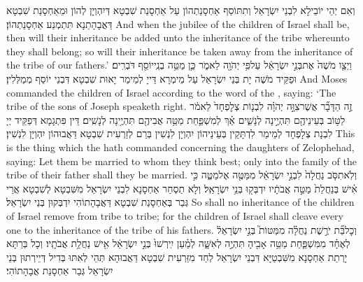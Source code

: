 {וְאִם יְהֵי יוֹבֵילָא לִבְנֵי יִשְׂרָאֵל וְתִתּוֹסַף אַחְסָנַתְהוֹן עַל אַחְסָנַת שִׁבְטָא דְּיִהְוְיָן לְהוֹן וּמֵאַחְסָנַת שִׁבְטָא דַּאֲבָהָתַנָא תִּתְמְנַע אַחְסָנַתְהוֹן׃}
{And when the jubilee of the children of Israel shall be, then will their inheritance be added unto the inheritance of the tribe whereunto they shall belong; so will their inheritance be taken away from the inheritance of the tribe of our fathers.’}{}
{וַיְצַ֤ו מֹשֶׁה֙ אֶת\maqqaf בְּנֵ֣י יִשְׂרָאֵ֔ל עַל\maqqaf פִּ֥י יְהֹוָ֖ה לֵאמֹ֑ר כֵּ֛ן מַטֵּ֥ה בְנֵֽי\maqqaf יוֹסֵ֖ף דֹּבְרִֽים׃}
{וּפַקֵּיד מֹשֶׁה יָת בְּנֵי יִשְׂרָאֵל עַל מֵימְרָא דַּייָ לְמֵימַר יָאוּת שִׁבְטָא דִּבְנֵי יוֹסֵף מְמַלְּלִין׃}
{And Moses commanded the children of Israel according to the word of the \lord, saying: ‘The tribe of the sons of Joseph speaketh right.}{}
{זֶ֣ה הַדָּבָ֞ר אֲשֶׁר\maqqaf צִוָּ֣ה יְהֹוָ֗ה לִבְנ֤וֹת צְלׇפְחָד֙ לֵאמֹ֔ר לַטּ֥וֹב בְּעֵינֵיהֶ֖ם תִּהְיֶ֣ינָה לְנָשִׁ֑ים אַ֗ךְ לְמִשְׁפַּ֛חַת מַטֵּ֥ה אֲבִיהֶ֖ם תִּהְיֶ֥ינָה לְנָשִֽׁים׃}
{דֵּין פִּתְגָמָא דְּפַקֵּיד יְיָ לִבְנָת צְלָפְחָד לְמֵימַר לִדְתָּקֵין בְּעֵינֵיהוֹן יִהְוְיָן לִנְשִׁין בְּרַם לְזַרְעִית שִׁבְטָא דַּאֲבוּהוֹן יִהְוְיָן לִנְשִׁין׃}
{This is the thing which the \lord\space hath commanded concerning the daughters of Zelophehad, saying: Let them be married to whom they think best; only into the family of the tribe of their father shall they be married.}{}
{וְלֹֽא\maqqaf תִסֹּ֤ב נַחֲלָה֙ לִבְנֵ֣י יִשְׂרָאֵ֔ל מִמַּטֶּ֖ה אֶל\maqqaf מַטֶּ֑ה כִּ֣י אִ֗ישׁ בְּנַחֲלַת֙ מַטֵּ֣ה אֲבֹתָ֔יו יִדְבְּק֖וּ בְּנֵ֥י יִשְׂרָאֵֽל׃}
{וְלָא תַסְחַר אַחְסָנָא לִבְנֵי יִשְׂרָאֵל מִשִּׁבְטָא לְשִׁבְטָא אֲרֵי גְּבַר בְּאַחְסָנַת שִׁבְטָא דַּאֲבָהָתוֹהִי יִדְבְּקוּן בְּנֵי יִשְׂרָאֵל׃}
{So shall no inheritance of the children of Israel remove from tribe to tribe; for the children of Israel shall cleave every one to the inheritance of the tribe of his fathers.}{}
{וְכׇל\maqqaf בַּ֞ת יֹרֶ֣שֶׁת נַחֲלָ֗ה מִמַּטּוֹת֮ בְּנֵ֣י יִשְׂרָאֵל֒ לְאֶחָ֗ד מִמִּשְׁפַּ֛חַת מַטֵּ֥ה אָבִ֖יהָ תִּהְיֶ֣ה לְאִשָּׁ֑ה לְמַ֗עַן יִֽירְשׁוּ֙ בְּנֵ֣י יִשְׂרָאֵ֔ל אִ֖ישׁ נַחֲלַ֥ת אֲבֹתָֽיו׃}
{וְכָל בְּרַתָּא יָרְתַת אַחְסָנָא מִשִּׁבְטַיָּא דִּבְנֵי יִשְׂרָאֵל לְחַד מִזַּרְעִית שִׁבְטָא דַּאֲבוּהָא תְּהֵי לְאִתּוּ בְּדִיל דְּיֵירְתוּן בְּנֵי יִשְׂרָאֵל גְּבַר אַחְסָנַת אֲבָהָתוֹהִי׃}
